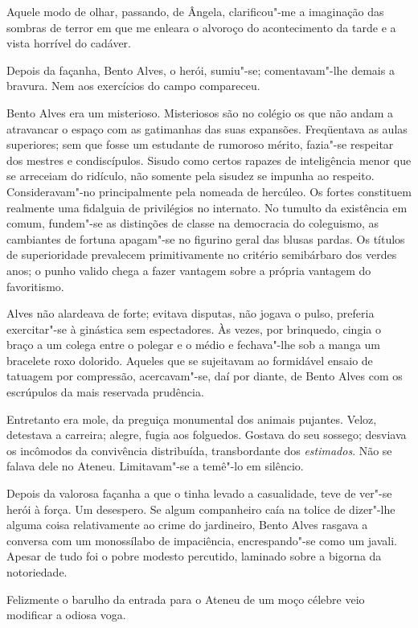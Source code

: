 Aquele modo de olhar,
passando, de Ângela, clarificou"-me a imaginação das sombras de terror
em que me enleara o alvoroço do acontecimento da tarde e a vista
horrível do cadáver. 

Depois da façanha, Bento Alves, o herói,
sumiu"-se; comentavam"-lhe demais a bravura. Nem aos exercícios do
campo compareceu. 

Bento Alves era um misterioso. Misteriosos são no
colégio os que não andam a atravancar o espaço com as gatimanhas das
suas expansões. Freqüentava as aulas superiores; sem que fosse um
estudante de rumoroso mérito, fazia"-se respeitar dos mestres e
condiscípulos. Sisudo como certos rapazes de inteligência menor que se
arreceiam do ridículo, não somente pela sisudez se impunha ao respeito.
Consideravam"-no principalmente pela nomeada de hercúleo. Os fortes
constituem realmente uma fidalguia de privilégios no internato. No
tumulto da existência em comum, fundem"-se as distinções de classe na
democracia do coleguismo, as cambiantes de fortuna apagam"-se no
figurino geral das blusas pardas. Os títulos de superioridade
prevalecem primitivamente no critério semibárbaro dos verdes anos; o
punho valido chega a fazer vantagem sobre a própria vantagem do
favoritismo. 

Alves não alardeava de forte; evitava disputas, não jogava
o pulso, preferia exercitar"-se à ginástica sem espectadores. Às
vezes, por brinquedo, cingia o braço a um colega entre o polegar e o
médio e fechava"-lhe sob a manga um bracelete roxo dolorido. Aqueles
que se sujeitavam ao formidável ensaio de tatuagem por compressão,
acercavam"-se, daí por diante, de Bento Alves com os escrúpulos da
mais reservada prudência. 

Entretanto era mole, da preguiça monumental
dos animais pujantes. Veloz, detestava a carreira; alegre, fugia aos
folguedos. Gostava do seu sossego; desviava os incômodos da convivência
distribuída, transbordante dos \textit{estimados}. Não se falava dele no Ateneu.
Limitavam"-se a temê"-lo em silêncio. 

Depois da valorosa façanha a
que o tinha levado a casualidade, teve de ver"-se herói à força. Um
desespero. Se algum companheiro caía na tolice de dizer"-lhe alguma
coisa relativamente ao crime do jardineiro, Bento Alves rasgava a
conversa com um monossílabo de impaciência, encrespando"-se como um
javali. Apesar de tudo foi o pobre modesto percutido, laminado sobre a
bigorna da notoriedade. 

Felizmente o barulho da entrada para o Ateneu
de um moço célebre veio modificar a odiosa voga. 

